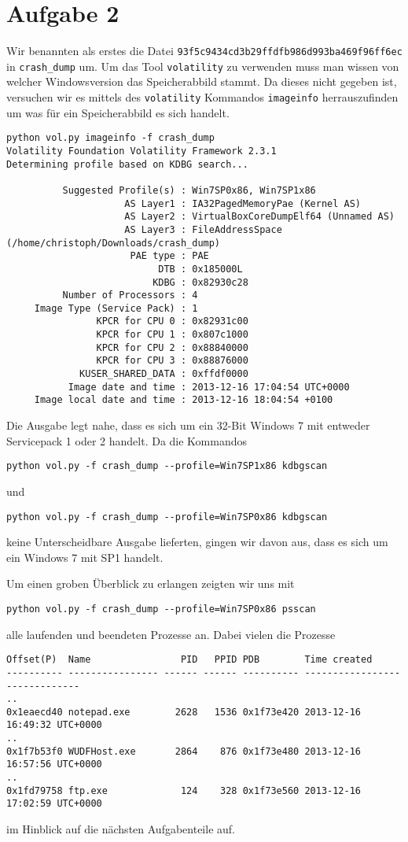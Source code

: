 \documentclass[10pt,a4paper]{article}
\begin{document}
\section*{Aufgabe 2}
Wir benannten als erstes die Datei \texttt{93f5c9434cd3b29ffdfb986d993ba469f96ff6ec} in \texttt{crash\_dump} um.
Um das Tool \texttt{volatility} zu verwenden muss man wissen von welcher Windowsversion das Speicherabbild stammt. Da dieses nicht gegeben ist, versuchen wir es mittels des \texttt{volatility} Kommandos \texttt{imageinfo} herrauszufinden um was für ein Speicherabbild es sich handelt.
\begin{verbatim}
python vol.py imageinfo -f crash_dump
Volatility Foundation Volatility Framework 2.3.1
Determining profile based on KDBG search...

          Suggested Profile(s) : Win7SP0x86, Win7SP1x86
                     AS Layer1 : IA32PagedMemoryPae (Kernel AS)
                     AS Layer2 : VirtualBoxCoreDumpElf64 (Unnamed AS)
                     AS Layer3 : FileAddressSpace (/home/christoph/Downloads/crash_dump)
                      PAE type : PAE
                           DTB : 0x185000L
                          KDBG : 0x82930c28
          Number of Processors : 4
     Image Type (Service Pack) : 1
                KPCR for CPU 0 : 0x82931c00
                KPCR for CPU 1 : 0x807c1000
                KPCR for CPU 2 : 0x88840000
                KPCR for CPU 3 : 0x88876000
             KUSER_SHARED_DATA : 0xffdf0000
           Image date and time : 2013-12-16 17:04:54 UTC+0000
     Image local date and time : 2013-12-16 18:04:54 +0100
\end{verbatim}
Die Ausgabe legt nahe, dass es sich um ein 32-Bit Windows 7 mit entweder Servicepack 1 oder 2 handelt. Da die Kommandos
\begin{verbatim}
python vol.py -f crash_dump --profile=Win7SP1x86 kdbgscan
\end{verbatim}
und 
\begin{verbatim}
python vol.py -f crash_dump --profile=Win7SP0x86 kdbgscan
\end{verbatim}
keine Unterscheidbare Ausgabe lieferten, gingen wir davon aus, dass es sich um ein Windows 7 mit SP1 handelt.

Um einen groben Überblick zu erlangen zeigten wir uns mit 
\begin{verbatim}
python vol.py -f crash_dump --profile=Win7SP0x86 psscan
\end{verbatim}
alle laufenden und beendeten Prozesse an. Dabei vielen die Prozesse
\begin{verbatim}
Offset(P)  Name                PID   PPID PDB        Time created                   
---------- ---------------- ------ ------ ---------- ------------------------------
..
0x1eaecd40 notepad.exe        2628   1536 0x1f73e420 2013-12-16 16:49:32 UTC+0000
..
0x1f7b53f0 WUDFHost.exe       2864    876 0x1f73e480 2013-12-16 16:57:56 UTC+0000
..
0x1fd79758 ftp.exe             124    328 0x1f73e560 2013-12-16 17:02:59 UTC+0000
\end{verbatim}
im Hinblick auf die nächsten Aufgabenteile auf. 
\end{document}
